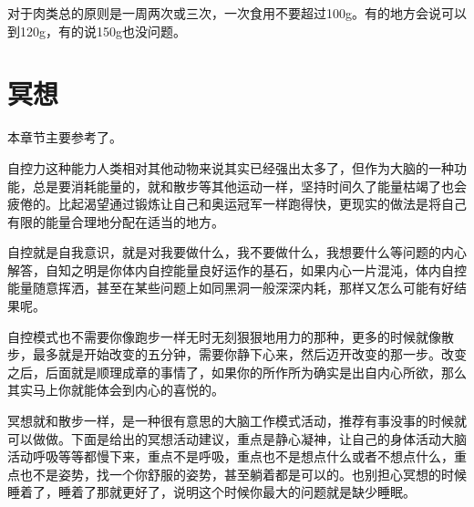 \documentclass[12pt,oneside]{book}
\begin{document}
对于肉类总的原则是一周两次或三次，一次食用不要超过100g。有的地方会说可以到120g，有的说150g也没问题。



\chapter{冥想}
本章节主要参考了\cite{自控力}。

自控力这种能力人类相对其他动物来说其实已经强出太多了，但作为大脑的一种功能，总是要消耗能量的，就和散步等其他运动一样，坚持时间久了能量枯竭了也会疲倦的。比起渴望通过锻炼让自己和奥运冠军一样跑得快，更现实的做法是将自己有限的能量合理地分配在适当的地方。

自控就是自我意识，就是对我要做什么，我不要做什么，我想要什么等问题的内心解答，自知之明是你体内自控能量良好运作的基石，如果内心一片混沌，体内自控能量随意挥洒，甚至在某些问题上如同黑洞一般深深内耗，那样又怎么可能有好结果呢。

自控模式也不需要你像跑步一样无时无刻狠狠地用力的那种，更多的时候就像散步，最多就是开始改变的五分钟，需要你静下心来，然后迈开改变的那一步。改变之后，后面就是顺理成章的事情了，如果你的所作所为确实是出自内心所欲，那么其实马上你就能体会到内心的喜悦的。

冥想就和散步一样，是一种很有意思的大脑工作模式活动，推荐有事没事的时候就可以做做。下面是\cite{自控力}给出的冥想活动建议，重点是静心凝神，让自己的身体活动大脑活动呼吸等等都慢下来，重点不是呼吸，重点也不是想点什么或者不想点什么，重点也不是姿势，找一个你舒服的姿势，甚至躺着都是可以的。也别担心冥想的时候睡着了，睡着了那就更好了，说明这个时候你最大的问题就是缺少睡眠。
\end{document}
